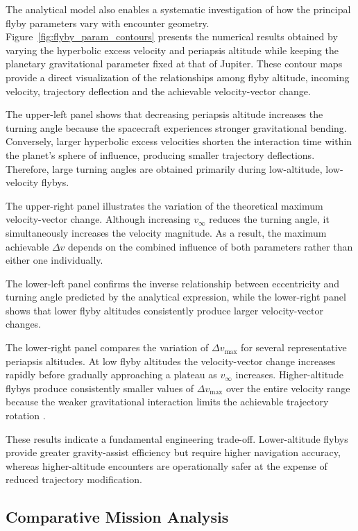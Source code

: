 \documentclass[11pt,a4paper]{article}
\begin{document}
The analytical model also enables a systematic investigation of how the principal flyby parameters vary with encounter geometry. Figure~\ref{fig:flyby_param_contours} presents the numerical results obtained by varying the hyperbolic excess velocity and periapsis altitude while keeping the planetary gravitational parameter fixed at that of Jupiter. These contour maps provide a direct visualization of the relationships among flyby altitude, incoming velocity, trajectory deflection and the achievable velocity-vector change.

The upper-left panel shows that decreasing periapsis altitude increases the turning angle because the spacecraft experiences stronger gravitational bending. Conversely, larger hyperbolic excess velocities shorten the interaction time within the planet's sphere of influence, producing smaller trajectory deflections. Therefore, large turning angles are obtained primarily during low-altitude, low-velocity flybys.

The upper-right panel illustrates the variation of the theoretical maximum velocity-vector change. Although increasing $v_\infty$ reduces the turning angle, it simultaneously increases the velocity magnitude. As a result, the maximum achievable $\Delta v$ depends on the combined influence of both parameters rather than either one individually.

The lower-left panel confirms the inverse relationship between eccentricity and turning angle predicted by the analytical expression, while the lower-right panel shows that lower flyby altitudes consistently produce larger velocity-vector changes.

The lower-right panel compares the variation of $\Delta v_{\max}$ for several representative periapsis altitudes. At low flyby altitudes the velocity-vector change increases rapidly before gradually approaching a plateau as $v_\infty$ increases. Higher-altitude flybys produce consistently smaller values of $\Delta v_{\max}$ over the entire velocity range because the weaker gravitational interaction limits the achievable trajectory rotation \cite{bate1971}.

These results indicate a fundamental engineering trade-off. Lower-altitude flybys provide greater gravity-assist efficiency but require higher navigation accuracy, whereas higher-altitude encounters are operationally safer at the expense of reduced trajectory modification.

\subsection{Comparative Mission Analysis}
\end{document}
